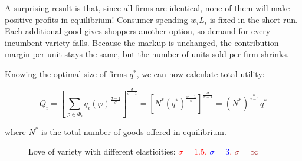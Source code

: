 \documentclass[11pt,letterpaper]{article}
\begin{document}
A surprising result is that, since all firms are identical, none of them will make positive profits in equilibrium! Consumer spending $w_iL_i$ is fixed in the short run. Each additional good gives shoppers another option, so demand for every incumbent variety falls. Because the markup is unchanged, the contribution margin per unit stays the same, but the number of units sold per firm shrinks.

Knowing the optimal size of firms $q^*$, we can now calculate total utility:

\begin{equation*}
    Q_i = \left[ \sum_{\varphi \in \Phi_i } q_i(
\varphi)^{\tfrac{\sigma-1}{\sigma}} \right]^{\tfrac{\sigma}{\sigma-1} }  = \left[ N^* ( q^*
)^{\tfrac{\sigma-1}{\sigma}} \right]^{\tfrac{\sigma}{\sigma-1} } = (N^*)^{\tfrac{\sigma}{\sigma-1} } q^* 
\end{equation*}

\noindent where $N^*$ is the total number of goods offered in equilibrium.


    \begin{figure}[htp]
        \centering
            \caption{Love of variety with different elasticities: \textcolor{red}{$\sigma=1.5$, \textcolor{blue}{$\sigma=3$}, \textcolor{brown}{$\sigma=\infty$}}}
        \label{fig: ces-love}
    \end{figure}
\end{document}
